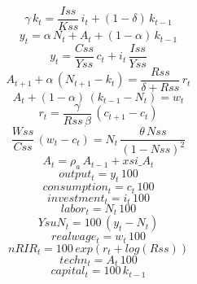 \documentclass[10pt,a4paper]{article}
\begin{document}
\footnotesize
\begin{dmath}
\gamma\, k_{t}=\frac{Iss}{Kss}\, i_{t}+\left(1-\delta\right)\, k_{t-1}
\end{dmath}
\begin{dmath}
y_{t}=\alpha\, N_{t}+A_{t}+\left(1-\alpha\right)\, k_{t-1}
\end{dmath}
\begin{dmath}
y_{t}=\frac{Css}{Yss}\, c_{t}+i_{t}\, \frac{Iss}{Yss}
\end{dmath}
\begin{dmath}
A_{t+1}+\alpha\, \left(N_{t+1}-k_{t}\right)=\frac{Rss}{\delta+Rss}\, r_{t}
\end{dmath}
\begin{dmath}
A_{t}+\left(1-\alpha\right)\, \left(k_{t-1}-N_{t}\right)=w_{t}
\end{dmath}
\begin{dmath}
r_{t}=\frac{\gamma}{Rss\, \beta}\, \left(c_{t+1}-c_{t}\right)
\end{dmath}
\begin{dmath}
\frac{Wss}{Css}\, \left(w_{t}-c_{t}\right)=N_{t}\, \frac{\theta\, Nss}{\left(1-Nss\right)^{2}}
\end{dmath}
\begin{dmath}
A_{t}=\rho_a\, A_{t-1}+xsi\_A_{t}
\end{dmath}
\begin{dmath}
output_{t}=y_{t}\, 100
\end{dmath}
\begin{dmath}
consumption_{t}=c_{t}\, 100
\end{dmath}
\begin{dmath}
investment_{t}=i_{t}\, 100
\end{dmath}
\begin{dmath}
labor_{t}=N_{t}\, 100
\end{dmath}
\begin{dmath}
YsuN_{t}=100\, \left(y_{t}-N_{t}\right)
\end{dmath}
\begin{dmath}
realwage_{t}=w_{t}\, 100
\end{dmath}
\begin{dmath}
nRIR_{t}=100\, exp\left(r_{t}+log\left(Rss\right)\right)
\end{dmath}
\begin{dmath}
techn_{t}=A_{t}\, 100
\end{dmath}
\begin{dmath}
capital_{t}=100\, k_{t-1}
\end{dmath}
\end{document}
